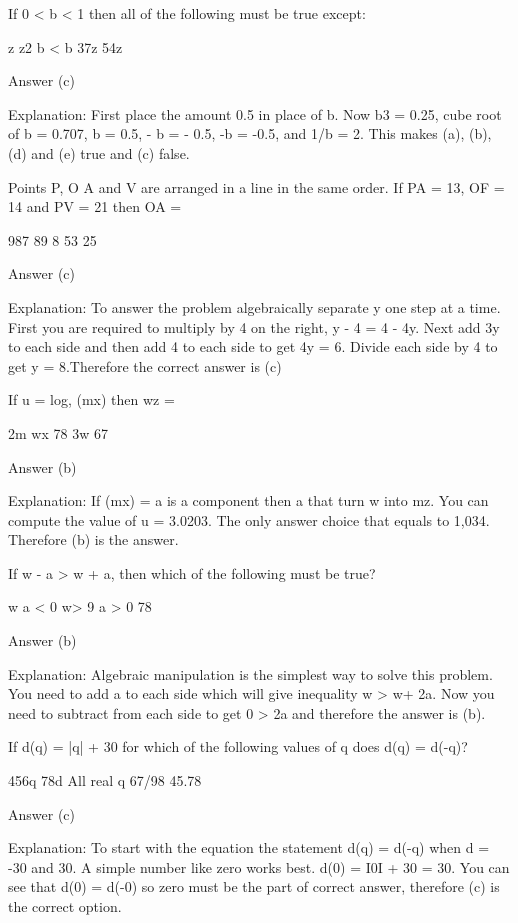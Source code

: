     If 0 < b < 1 then all of the following must be true except:

        z
        z2
        b < b
        37z
        54z 

    Answer (c)

    Explanation: First place the amount 0.5 in place of b. Now b3 = 0.25, cube root of b = 0.707, b = 0.5, - b = - 0.5, -b = -0.5, and 1/b = 2. This makes (a), (b), (d) and (e) true and (c) false.

    Points P, O A and V are arranged in a line in the same order. If PA = 13, OF = 14 and PV = 21 then OA =

        987
        89
        8
        53
        25 

    Answer (c)

    Explanation: To answer the problem algebraically separate y one step at a time. First you are required to multiply by 4 on the right, y - 4 = 4 - 4y. Next add 3y to each side and then add 4 to each side to get 4y = 6. Divide each side by 4 to get y = 8.Therefore the correct answer is (c)

    If u = log, (mx) then wz =

        2m
        wx
        78
        3w
        67 

    Answer (b)

    Explanation: If (mx) = a is a component then a that turn w into mz. You can compute the value of u = 3.0203. The only answer choice that equals to 1,034. Therefore (b) is the answer.

    If w - a > w + a, then which of the following must be true?

        w
        a < 0
        w> 9
        a > 0
        78 

    Answer (b)

    Explanation: Algebraic manipulation is the simplest way to solve this problem. You need to add a to each side which will give inequality w > w+ 2a. Now you need to subtract from each side to get 0 > 2a and therefore the answer is (b). 



    If d(q) = |q| + 30 for which of the following values of q does d(q) = d(-q)?

        456q
        78d
        All real q
        67/98
        45.78 

    Answer (c)

    Explanation: To start with the equation the statement d(q) = d(-q) when d = -30 and 30. A simple number like zero works best. d(0) = Ι0Ι + 30 = 30. You can see that d(0) = d(-0) so zero must be the part of correct answer, therefore (c) is the correct option.

